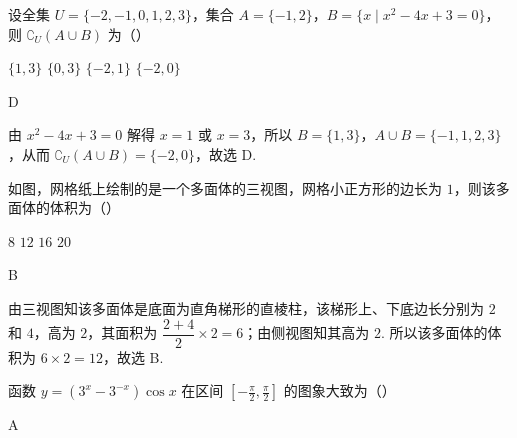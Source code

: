 \begin{problem}
设全集 \(U=\{-2,-1,0,1,2,3\}\)，集合 \(A=\{-1,2\}\)，\(B=\{x\mid x^2-4x+3=0\}\)，则 \(\complement_U(A\cup B)\) 为（\quad）

\choices
    {\(\{1,3\}\)}
    {\(\{0,3\}\)}
    {\(\{-2,1\}\)}
    {\(\{-2,0\}\)}
\end{problem}

\begin{answer}
D
\end{answer}

\begin{solution}
由 \(x^2-4x+3=0\) 解得 \(x=1\) 或 \(x=3\)，所以 \(B=\{1,3\}\)，\(A\cup B=\{-1,1,2,3\}\)，从而 \(\complement_U(A\cup B)=\{-2,0\}\)，故选 D.
\end{solution}

\begin{problem}
如图，网格纸上绘制的是一个多面体的三视图，网格小正方形的边长为 \(1\)，则该多面体的体积为（\quad）


\choices
    {\(8\)}
    {\(12\)}
    {\(16\)}
    {\(20\)}
\end{problem}

\begin{answer}
B
\end{answer}

\begin{solution}
由三视图知该多面体是底面为直角梯形的直棱柱，该梯形上、下底边长分别为 \(2\) 和 \(4\)，高为 \(2\)，其面积为 \(\dfrac{2+4}{2}\times2=6\)；由侧视图知其高为 \(2\). 所以该多面体的体积为 \(6\times2=12\)，故选 B.
\end{solution}

\begin{problem}
函数 \(y=\left( 3^x-3^{-x} \right)\cos x\) 在区间 \(\left[ -\frac{\pi}{2},\frac{\pi}{2} \right]\) 的图象大致为（\quad）

    {}
    {}
    {}
\end{problem}

\begin{answer}
A
\end{answer}

